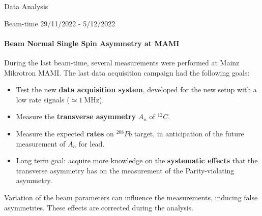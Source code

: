 \documentclass[9pt,a4paper]{beamer}
\newcommand{\commento}[1]{}
\begin{document}
\commento{
\begin{frame}{Detector Tests}

\end{frame}}

\begin{frame}[noframenumbering]{Data Analysis}
\begin{center}
\end{center}
\end{frame}

\begin{frame}{Beam-time 29/11/2022 - 5/12/2022}
\framesubtitle{Beam Normal Single Spin Asymmetry at MAMI}
During the last beam-time, several measurements were performed at Mainz Mikrotron MAMI. The last data acquisition campaign had the following goals:

\begin{itemize}
\item Test the new \textbf{data acquisition system}, developed for the new setup with a low rate signals ($\simeq \SI{1}{\mega \hertz} $). 
\item Measure the \textbf{transverse asymmetry} $A_{n}$ of $^{12}C$.
\item Measure the expected \textbf{rates} on $^{208}Pb$ target, in anticipation of the future measurement of $A_{n}$ for lead. 
\item Long term goal: acquire more knowledge on the \textbf{systematic effects} that the transverse asymmetry has on the measurement of the Parity-violating asymmetry.
\end{itemize}

Variation of the beam parameters can influence the measurements, inducing false asymmetries. These effects are corrected during the analysis. 
\end{frame}
\end{document}
